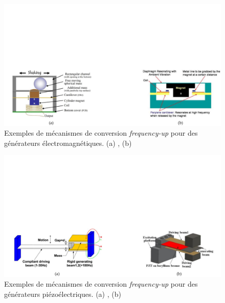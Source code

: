 \begin{figure}[!htbp]
	\begin{center}
		\captionsetup{justification=centering}
		\includegraphics[trim={1cm 0cm 0cm 10cm},clip, width=\textwidth]{../Chap1/Figure/frequency-up_EM.pdf}
		\caption{Exemples de mécanismes de conversion \emph{frequency-up} pour des générateurs électromagnétiques. (a) \cite{Halim2013}, (b) \cite{Sari2010}}
		\label{fig:frequency-up electromag}
	\end{center}
\end{figure}
\begin{figure}[!htbp]
	\begin{center}
		\captionsetup{justification=centering}
		\includegraphics[trim={1cm 0cm 0cm 10cm},clip, width=\textwidth]{../Chap1/Figure/frequency-up_piezo.pdf}
		\caption{Exemples de mécanismes de conversion \emph{frequency-up} pour des générateurs piézoélectriques. (a) \cite{Gu2011}, (b) \cite{Zhang2018}}
		\label{fig:frequency-up piezo}
	\end{center}
\end{figure}
